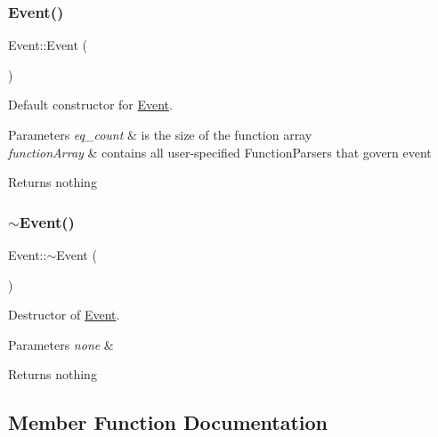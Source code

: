 \subsubsection{\texorpdfstring{Event()}{Event()}}
{\footnotesize\ttfamily Event\+::\+Event (\begin{DoxyParamCaption}{ }\end{DoxyParamCaption})}



Default constructor for \hyperlink{class_event}{Event}. 


\begin{DoxyParams}{Parameters}
{\em eq\+\_\+count} & is the size of the function array \\
\hline
{\em function\+Array} & contains all user-\/specified Function\+Parsers that govern event \\
\hline
\end{DoxyParams}
\begin{DoxyReturn}{Returns}
nothing 
\end{DoxyReturn}
\mbox{\label{class_event_a7704ec01ce91e673885792054214b3d2}} 
\subsubsection{\texorpdfstring{$\sim$\+Event()}{~Event()}}
{\footnotesize\ttfamily Event\+::$\sim$\+Event (\begin{DoxyParamCaption}{ }\end{DoxyParamCaption})}



Destructor of \hyperlink{class_event}{Event}. 


\begin{DoxyParams}{Parameters}
{\em none} & \\
\hline
\end{DoxyParams}
\begin{DoxyReturn}{Returns}
nothing 
\end{DoxyReturn}


\subsection{Member Function Documentation}
\mbox{\label{class_event_ad380e41418d2e34b651e052711fefe83}} 

